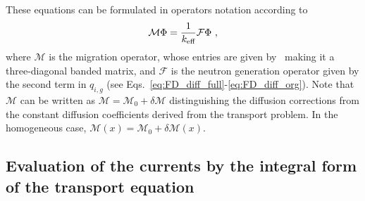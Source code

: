 These equations can be formulated in operators notation according to
\begin{equation}\label{eq:op-not}
\mathcal{M}\Phi=\frac{1}{{k_{\textrm{\scriptsize{eff}}}}}\mathcal{F}\Phi \,\, ,
\end{equation}
where $\mathcal{M}$ is the migration operator, whose entries are given by~ making it a three-diagonal banded matrix, and $\mathcal{F}$ is the neutron generation operator given by the second term in $q_{i,g}$ (see Eqs.~\ref{eq:FD_diff_full}-\ref{eq:FD_diff_org}). Note that $\mathcal{M}$ can be written as $\mathcal{M}=\mathcal{M}_0+\delta\mathcal{M}$ distinguishing the diffusion corrections from the constant diffusion coefficients derived from the transport problem. In the homogeneous case, $\mathcal{M}(x)=\mathcal{M}_0+\delta\mathcal{M}(x)$.
%
%
\subsection{Evaluation of the currents by the integral form of the transport equation}
\label{sec:calc-int-curr}

